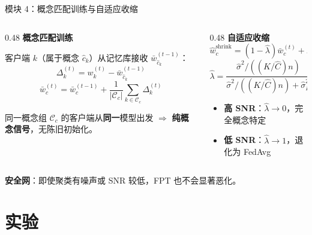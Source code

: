 \documentclass[aspectratio=169,11pt]{ctexbeamer}
\newcommand{\wbar}{\bar{w}}
\newcommand{\what}{\hat{w}}
\begin{document}
\begin{frame}{模块 4：概念匹配训练与自适应收缩}

\begin{columns}[T]
\begin{column}{0.48\textwidth}
\textbf{概念匹配训练}

客户端 $k$（属于概念 $\hat{c}_k$）从记忆库接收 $\wbar_{\hat{c}_k}^{(t-1)}$：
\vspace{-2pt}
$$\Delta_k^{(t)} = w_k^{(t)} - \wbar_{\hat{c}_k}^{(t-1)}$$
\vspace{-8pt}
$$\wbar_c^{(t)} = \wbar_c^{(t-1)} + \frac{1}{|\mathcal{C}_c|}\sum_{k\in\mathcal{C}_c}\Delta_k^{(t)}$$

\vspace{-2pt}
{\small 同一概念组 $\mathcal{C}_c$ 的客户端从\textbf{同一}模型出发 $\Rightarrow$ \textbf{纯概念信号}，无陈旧初始化。}
\end{column}

\begin{column}{0.48\textwidth}
\textbf{自适应收缩}
\vspace{-2pt}
$$\what_c^{\mathrm{shrink}} = (1{-}\hat\lambda)\wbar_c^{(t)} + \hat\lambda\,\wbar^{(t)}$$
\vspace{-8pt}
$$\hat\lambda = \frac{\hat\sigma^2/((K/\hat{C})n)}{\hat\sigma^2/((K/\hat{C})n) + \hat\sigma_B^2}$$

\vspace{-2pt}
\begin{itemize}\setlength\itemsep{1pt}
  \item \textbf{高 SNR}：$\hat\lambda \to 0$，完全概念特定
  \item \textbf{低 SNR}：$\hat\lambda \to 1$，退化为 FedAvg
\end{itemize}
\end{column}
\end{columns}

\vspace{4pt}
\centering
\textcolor{cC}{\textbf{安全网}：即使聚类有噪声或 SNR 较低，FPT 也不会显著恶化。}
\end{frame}

\section{实验}
\end{document}
